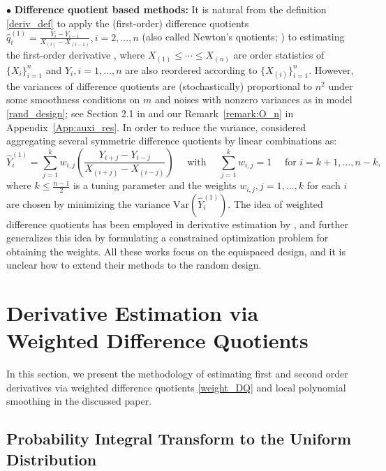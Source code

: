 \documentclass{uwstat572}
\theoremstyle{definition}
\renewcommand{\hat}{\widehat}
\theoremstyle{theorem}
\begin{document}
$\bullet$ {\bf Difference quotient based methods:} It is natural from the definition \eqref{deriv_def} to apply the (first-order) difference quotients $\hat{q}_i^{(1)} = \frac{Y_i - Y_{i-1}}{X_{(i)}- X_{(i-1)}}, i=2,...,n$ (also called Newton's quotients; \citealt{lang1968analysis}) to estimating the first-order derivative \citep{muller1987bandwidth,hardle1990applied,charnigo2011generalized}, where $X_{(1)}\leq \cdots \leq X_{(n)}$ are order statistics of $\{X_i\}_{i=1}^n$ and $Y_i,i=1,...,n$ are also reordered according to $\{X_{(i)}\}_{i=1}^n$. However, the variances of difference quotients are (stochastically) proportional to $n^2$ under some smoothness conditions on $m$ and noises with nonzero variances as in model \eqref{rand_design}; see Section 2.1 in \cite{de2013derivative} and our Remark~\ref{remark:O_n} in Appendix~\ref{App:auxi_res}. In order to reduce the variance, \cite{iserles2009first} considered aggregating several symmetric difference quotients by linear combinations as:
\begin{equation}
\label{weight_DQ}
\hat{Y}_i^{(1)} = \sum_{j=1}^k w_{i,j}\left(\frac{Y_{i+j} - Y_{i-j}}{X_{(i+j)} - X_{(i-j)}}\right) \quad \text{ with } \quad \sum_{j=1}^k w_{i,j}=1 \quad \text{ for } i=k+1,...,n-k,
\end{equation}
where $k \leq \frac{n-1}{2}$ is a tuning parameter and the weights $w_{i,j}, j=1,...,k$ for each $i$ are chosen by minimizing the variance $\mathrm{Var}(\hat{Y}_i^{(1)})$. The idea of weighted difference quotients has been employed in derivative estimation by \cite{de2013derivative,wang2015derivative}, and \cite{dai2016optimal} further generalizes this idea by formulating a constrained optimization problem for obtaining the weights. All these works focus on the equispaced design, and it is unclear how to extend their methods to the random design. 


\section{Derivative Estimation via Weighted Difference Quotients}
\label{Sec:method}

In this section, we present the methodology of estimating first and second order derivatives via weighted difference quotients \eqref{weight_DQ} and local polynomial smoothing in the discussed paper. 

\subsection{Probability Integral Transform to the Uniform Distribution}
\label{Sec:PIT}
\end{document}
